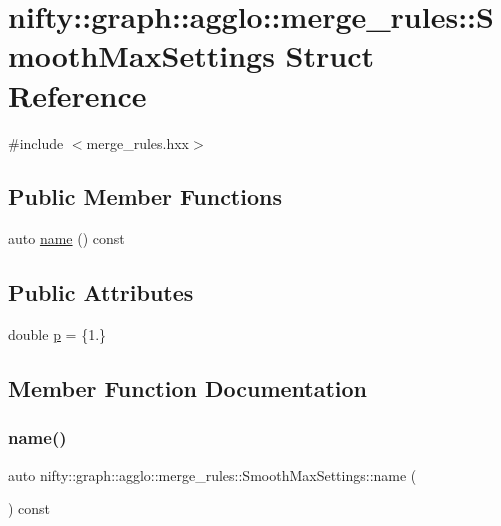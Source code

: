 \hypertarget{structnifty_1_1graph_1_1agglo_1_1merge__rules_1_1SmoothMaxSettings}{}\section{nifty\+:\+:graph\+:\+:agglo\+:\+:merge\+\_\+rules\+:\+:Smooth\+Max\+Settings Struct Reference}
\label{structnifty_1_1graph_1_1agglo_1_1merge__rules_1_1SmoothMaxSettings}


{\ttfamily \#include $<$merge\+\_\+rules.\+hxx$>$}

\subsection*{Public Member Functions}
\begin{DoxyCompactItemize}
\item 
auto \hyperlink{structnifty_1_1graph_1_1agglo_1_1merge__rules_1_1SmoothMaxSettings_a34c26e3624242cd6ed5a66e9a4a338a9}{name} () const
\end{DoxyCompactItemize}
\subsection*{Public Attributes}
\begin{DoxyCompactItemize}
\item 
double \hyperlink{structnifty_1_1graph_1_1agglo_1_1merge__rules_1_1SmoothMaxSettings_a42d3519eae9e6ada7012008b04e3167a}{p} = \{1.\}
\end{DoxyCompactItemize}


\subsection{Member Function Documentation}
\mbox{\label{structnifty_1_1graph_1_1agglo_1_1merge__rules_1_1SmoothMaxSettings_a34c26e3624242cd6ed5a66e9a4a338a9}} 
\subsubsection{\texorpdfstring{name()}{name()}}
{\footnotesize\ttfamily auto nifty\+::graph\+::agglo\+::merge\+\_\+rules\+::\+Smooth\+Max\+Settings\+::name (\begin{DoxyParamCaption}{ }\end{DoxyParamCaption}) const\hspace{0.3cm}{\ttfamily [inline]}}



